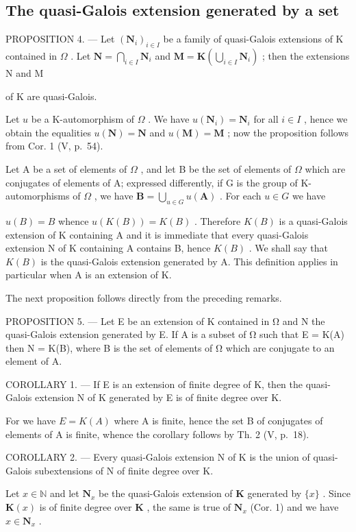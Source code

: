 \subsection{The quasi-Galois extension generated by a set}

PROPOSITION 4. --- Let \((\mathbf{N}_i)_{i\in I}\) be a family of quasi-Galois extensions of K contained in \(\Omega\) . Let \(\mathbf{N} = \bigcap_{i\in I}\mathbf{N}_i\) and \(\mathbf{M} = \mathbf{K}\left(\bigcup_{i\in I}\mathbf{N}_i\right)\) ; then the extensions N and M

of K are quasi-Galois.

Let \(u\) be a K-automorphism of \(\Omega\) . We have \(u(\mathbf{N}_i) = \mathbf{N}_i\) for all \(i \in I\) , hence we obtain the equalities \(u(\mathbf{N}) = \mathbf{N}\) and \(u(\mathbf{M}) = \mathbf{M}\) ; now the proposition follows from Cor. 1 (V, p.~54).

Let A be a set of elements of \(\Omega\) , and let B be the set of elements of \(\Omega\) which are conjugates of elements of A; expressed differently, if G is the group of K-automorphisms of \(\Omega\) , we have \(\mathbf{B} = \bigcup_{u \in G} u(\mathbf{A})\) . For each \(u \in G\) we have

\(u(B) = B\) whence \(u(K(B)) = K(B)\) . Therefore \(K(B)\) is a quasi-Galois extension of K containing A and it is immediate that every quasi-Galois extension N of K containing A contains B, hence \(K(B)\) . We shall say that \(K(B)\) is the quasi-Galois extension generated by A. This definition applies in particular when A is an extension of K.

The next proposition follows directly from the preceding remarks.

PROPOSITION 5. --- Let E be an extension of K contained in Ω and N the quasi-Galois extension generated by E. If A is a subset of Ω such that E = K(A) then N = K(B), where B is the set of elements of Ω which are conjugate to an element of A.

COROLLARY 1. --- If E is an extension of finite degree of K, then the quasi-Galois extension N of K generated by E is of finite degree over K.

For we have \(E = K(A)\) where A is finite, hence the set B of conjugates of elements of A is finite, whence the corollary follows by Th. 2 (V, p.~18).

COROLLARY 2. --- Every quasi-Galois extension N of K is the union of quasi-Galois subextensions of N of finite degree over K.

Let \(x \in \mathbb{N}\) and let \(\mathbf{N}_x\) be the quasi-Galois extension of \(\mathbf{K}\) generated by \(\{x\}\) . Since \(\mathbf{K}(x)\) is of finite degree over \(\mathbf{K}\) , the same is true of \(\mathbf{N}_x\) (Cor. 1) and we have \(x \in \mathbf{N}_x\) .

